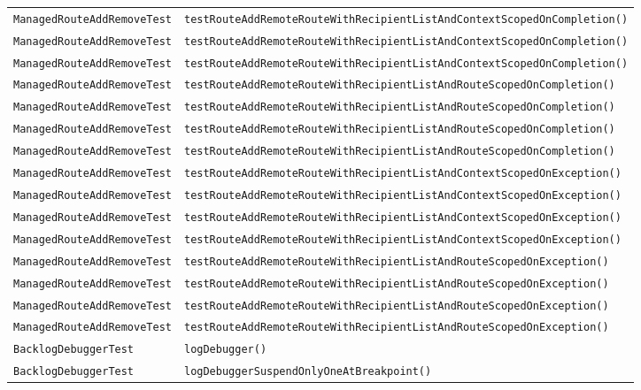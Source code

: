 \begin{center}
\begin{longtable}{ll}
\lstinline/ManagedRouteAddRemoveTest/&{\lstinline/testRouteAddRemoteRouteWithRecipientListAndContextScopedOnCompletion()/}\\
\lstinline/ManagedRouteAddRemoveTest/&{\lstinline/testRouteAddRemoteRouteWithRecipientListAndContextScopedOnCompletion()/}\\
\lstinline/ManagedRouteAddRemoveTest/&{\lstinline/testRouteAddRemoteRouteWithRecipientListAndContextScopedOnCompletion()/}\\
\lstinline/ManagedRouteAddRemoveTest/&{\lstinline/testRouteAddRemoteRouteWithRecipientListAndRouteScopedOnCompletion()/}\\
\lstinline/ManagedRouteAddRemoveTest/&{\lstinline/testRouteAddRemoteRouteWithRecipientListAndRouteScopedOnCompletion()/}\\
\lstinline/ManagedRouteAddRemoveTest/&{\lstinline/testRouteAddRemoteRouteWithRecipientListAndRouteScopedOnCompletion()/}\\
\lstinline/ManagedRouteAddRemoveTest/&{\lstinline/testRouteAddRemoteRouteWithRecipientListAndRouteScopedOnCompletion()/}\\
\lstinline/ManagedRouteAddRemoveTest/&{\lstinline/testRouteAddRemoteRouteWithRecipientListAndContextScopedOnException()/}\\
\lstinline/ManagedRouteAddRemoveTest/&{\lstinline/testRouteAddRemoteRouteWithRecipientListAndContextScopedOnException()/}\\
\lstinline/ManagedRouteAddRemoveTest/&{\lstinline/testRouteAddRemoteRouteWithRecipientListAndContextScopedOnException()/}\\
\lstinline/ManagedRouteAddRemoveTest/&{\lstinline/testRouteAddRemoteRouteWithRecipientListAndContextScopedOnException()/}\\
\lstinline/ManagedRouteAddRemoveTest/&{\lstinline/testRouteAddRemoteRouteWithRecipientListAndRouteScopedOnException()/}\\
\lstinline/ManagedRouteAddRemoveTest/&{\lstinline/testRouteAddRemoteRouteWithRecipientListAndRouteScopedOnException()/}\\
\lstinline/ManagedRouteAddRemoveTest/&{\lstinline/testRouteAddRemoteRouteWithRecipientListAndRouteScopedOnException()/}\\
\lstinline/ManagedRouteAddRemoveTest/&{\lstinline/testRouteAddRemoteRouteWithRecipientListAndRouteScopedOnException()/}\\
\lstinline/BacklogDebuggerTest/&{\lstinline/logDebugger()/}\\
\lstinline/BacklogDebuggerTest/&{\lstinline/logDebuggerSuspendOnlyOneAtBreakpoint()/}\\

\end{longtable}
\end{center}
